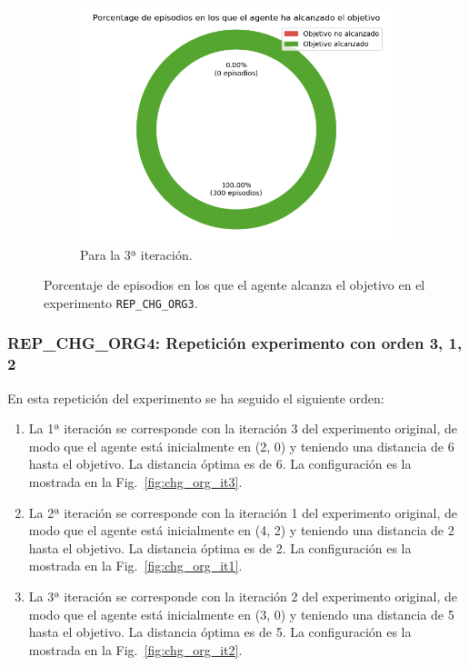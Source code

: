 \begin{figure}
\begin{subfigure}{.5\textwidth}
    \end{subfigure}
    \begin{subfigure}{.5\textwidth}
        \centering
        \includegraphics[scale=0.3]{cap5_experimentacion/images/CHANGE_ORIGIN-20_09-00_54-1, 2, 0_it3_porcentajeResuelto.png}
        \caption{Para la 3ª iteración.}
        \label{fig:CHANGE_ORIGIN-20_09-00_54-1, 2, 0_it3_porcentajeResuelto}
    \end{subfigure}%
    \caption{Porcentaje de episodios en los que el agente alcanza el objetivo en el experimento \texttt{REP\_CHG\_ORG3}.}
    \label{fig:CHANGE_ORIGIN-20_09-00_54-1, 2, 0_porcentajeResuelto}
\end{figure}

\subsubsection{REP\_CHG\_ORG4: Repetición experimento con orden 3, 1, 2} \label{REP_CHG_ORG4}

En esta repetición del experimento se ha seguido el siguiente orden: 
\begin{enumerate}
    \item La 1ª iteración se corresponde con la iteración 3 del experimento original, de modo que el agente está inicialmente en (2, 0) y teniendo una distancia de 6 hasta el objetivo. La distancia óptima es de 6. La configuración es la mostrada en la Fig.~\ref{fig:chg_org_it3}.
    \item La 2ª iteración se corresponde con la iteración 1 del experimento original, de modo que el agente está inicialmente en (4, 2) y teniendo una distancia de 2 hasta el objetivo. La distancia óptima es de 2. La configuración es la mostrada en la Fig.~\ref{fig:chg_org_it1}.
    \item La 3ª iteración se corresponde con la iteración 2 del experimento original, de modo que el agente está inicialmente en (3, 0) y teniendo una distancia de 5 hasta el objetivo. La distancia óptima es de 5. La configuración es la mostrada en la Fig.~\ref{fig:chg_org_it2}.
\end{enumerate}

